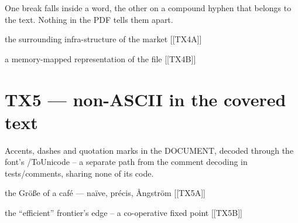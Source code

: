 \documentclass[11pt,a4paper]{article}
\begin{document}
One break falls inside a word, the other on a compound hyphen that
belongs to the text. Nothing in the PDF tells them apart.

\parbox{0.9\textwidth}{\raggedright
the surrounding infra-\linebreak structure of the market [[TX4A]]%
}

\parbox{0.9\textwidth}{\raggedright
a memory-\linebreak mapped representation of the file [[TX4B]]%
}

\section*{TX5 --- non-ASCII in the covered text}

Accents, dashes and quotation marks in the DOCUMENT, decoded through
the font's /ToUnicode -- a separate path from the comment decoding in
tests/comments, sharing none of its code.

the Größe of a café --- naïve, précis, Ångström [[TX5A]]

the ``efficient'' frontier's edge -- a co-operative fixed point [[TX5B]]
\end{document}
